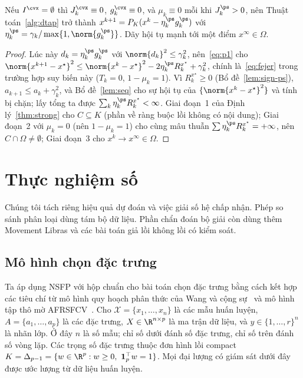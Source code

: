 \begin{corollary}\label{cor:ps}
Nếu $I^{\cvx}=\emptyset$ thì $J^{\cvx}_k\equiv0$, $g^{\cvx}_k\equiv0$, và $\mu_k\equiv0$
mỗi khi $J^{\ps}_k>0$, nên Thuật toán~\ref{alg:dtap} trở thành
$x^{k+1}=P_K(x^k-\eta^{\ps}_k g^{\ps}_k)$ với $\eta^{\ps}_k=\gamma_k/\max\{1,\norm{g^{\ps}_k}\}$.
Dãy hội tụ mạnh tới một điểm $x^\infty\in\Omega$.
\end{corollary}
\begin{proof}
Lúc này $d_k=\eta^{\ps}_k g^{\ps}_k$ với $\norm{d_k}^2\le\gamma_k^2$, nên~\eqref{eq:p1} cho
$\norm{x^{k+1}-x^\star}^2\le\norm{x^k-x^\star}^2-2\eta^{\ps}_k R^{x^\star}_k+\gamma_k^2$,
chính là~\eqref{eq:fejer} trong trường hợp suy biến này ($T_k=0$, $1-\mu_k=1$). Vì
$R^{x^\star}_k\ge0$ (Bổ đề~\ref{lem:sign-ps}), $a_{k+1}\le a_k+\gamma_k^2$, và
Bổ đề~\ref{lem:seq} cho sự hội tụ của $\{\norm{x^k-x^\star}^2\}$ và tính bị chặn;
lấy tổng ta được $\sum_k\eta^{\ps}_k R^{x^\star}_k<\infty$. Giai đoạn~1 của
Định lý~\ref{thm:strong} cho $C\subseteq K$ (phần về ràng buộc lồi không có nội dung); Giai đoạn~2 với
$\mu_k=0$ (nên $1-\mu_k=1$) cho cùng mâu thuẫn $\sum\eta^{\ps}_k R^{x^\star}_k=+\infty$,
nên $C\cap\Omega\ne\emptyset$; Giai đoạn~3 cho $x^k\to x^\infty\in\Omega$.
\end{proof}


\section{Thực nghiệm số}\label{sec:experiments}
Chúng tôi tách riêng hiệu quả dự đoán và việc giải số hệ chấp nhận. Phép so sánh phân loại dùng tám bộ dữ liệu. Phần chẩn đoán bộ giải còn dùng thêm Movement Libras và các bài toán giả lồi không lồi có kiểm soát.

\subsection{Mô hình chọn đặc trưng}\label{sec:fs}
Ta áp dụng NSFP với hộp chuẩn cho bài toán chọn đặc trưng bằng cách kết hợp các tiêu chí từ mô hình quy hoạch phân thức của Wang và cộng sự~\citep{wang2021fractional} và mô hình tập thô mờ AFRSFCV~\citep{wang2026afrsfcv}. Cho $\mathcal{X}=\{x_1,\ldots,x_n\}$ là các mẫu huấn luyện, $A=\{a_1,\ldots,a_p\}$ là các đặc trưng, $X\in\R^{n\times p}$ là ma trận dữ liệu, và $y\in\{1,\ldots,r\}^n$ là nhãn lớp. Ở đây $n$ là số mẫu; chỉ số dưới đánh số đặc trưng, chỉ số trên đánh số vòng lặp. Các trọng số đặc trưng thuộc đơn hình lồi compact $K=\Delta_{p-1}=\{w\in\R^p:w\ge0,\ \mathbf1_p^{\top}w=1\}$. Mọi đại lượng có giám sát dưới đây được ước lượng từ dữ liệu huấn luyện.

